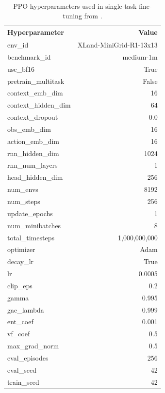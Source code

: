 \documentclass{article}
\begin{document}
\begin{table}[h!]
    \begin{small}
    \begin{center}
    \caption{PPO hyperparameters used in single-task fine-tuning from .}
    \label{table:ppo-hparams}
        \begin{tabular}{lr}
		\toprule
            \textbf{Hyperparameter} & \textbf{Value} \\
		\midrule
            env\_id                 & XLand-MiniGrid-R1-13x13 \\
            benchmark\_id           & medium-1m \\
            use\_bf16               & True \\
            pretrain\_multitask     & False \\
            context\_emb\_dim       & 16 \\
            context\_hidden\_dim    & 64 \\
            context\_dropout        & 0.0 \\
            obs\_emb\_dim           & 16 \\
            action\_emb\_dim        & 16 \\
            rnn\_hidden\_dim        & 1024 \\
            rnn\_num\_layers        & 1 \\
            head\_hidden\_dim       & 256 \\
            num\_envs               & 8192 \\
            num\_steps              & 256 \\
            update\_epochs          & 1 \\
            num\_minibatches        & 8 \\
            total\_timesteps        & 1,000,000,000 \\
            optimizer               & Adam \\
            decay\_lr               & True \\
            lr                      & 0.0005 \\
            clip\_eps               & 0.2 \\
            gamma                   & 0.995 \\
            gae\_lambda             & 0.999 \\
            ent\_coef               & 0.001 \\
            vf\_coef                & 0.5 \\
            max\_grad\_norm         & 0.5 \\
            eval\_episodes          & 256 \\
            eval\_seed              & 42 \\
            train\_seed             & 42 \\
		\bottomrule
		\end{tabular}
    \end{center}
    \end{small}
\end{table}
\clearpage
\end{document}
